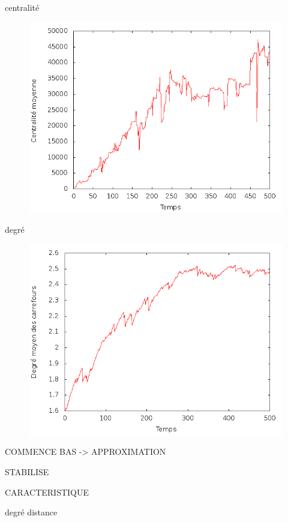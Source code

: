 \documentclass[12pt]{article}
\begin{document}
\begin{figure}[H]
  \centering
  \caption{}
\end{figure}

centralité

\begin{figure}[H]
  \centering
  \includegraphics[width=.8\linewidth]{images/centrality.png}
  \caption{}
\end{figure}

degré

\begin{figure}[H]
  \centering
  \includegraphics[width=.8\linewidth]{images/degree.png}
  \caption{}
\end{figure}

COMMENCE BAS -> APPROXIMATION

STABILISE

CARACTERISTIQUE

degré distance
\end{document}
